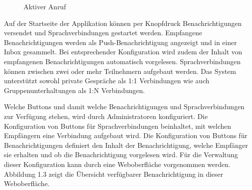 \begin{figure}[h]
\begin{minipage}[b]{0.4\textwidth}
        \caption{Aktiver Anruf}
    \end{minipage}
    \label{fig:MobileClient-ScreensIntroduction}
\end{figure}

Auf der Startseite der Applikation können per Knopfdruck Benachrichtigungen versendet und Sprachverbindungen gestartet werden.
Empfangene Benachrichtigungen werden als Push-Benachrichtigung angezeigt und in einer Inbox gesammelt.
Bei entsprechender Konfiguration wird zudem der Inhalt von empfangenen Benachrichtigungen automatisch vorgelesen.
Sprachverbindungen können zwischen zwei oder mehr Teilnehmern aufgebaut werden.
Das System unterstützt sowohl private Gespräche als 1:1 Verbindungen wie auch Gruppenunterhaltungen als 1:N Verbindungen.

Welche Buttons und damit welche Benachrichtigungen und Sprachverbindungen zur Verfügung stehen, wird durch Administratoren konfiguriert.
Die Konfiguration von Buttons für Sprachverbindungen beinhaltet, mit welchen Empfängern eine Verbindung aufgebaut wird.
Die Konfiguration von Buttons für Benachrichtigungen definiert den Inhalt der Benachrichtigung, welche Empfänger sie erhalten und ob die Benachrichtigung vorgelesen wird.
Für die Verwaltung dieser Konfiguration kann durch eine Weboberfläche vorgenommen werden.
Abbildung 1.3 zeigt die Übersicht verfügbarer Benachrichtigung in dieser Weboberfläche.

